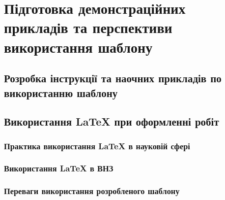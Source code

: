 \chapter{Підготовка демонстраційних прикладів та перспективи використання шаблону} 
\label{chap:first}



\section{Розробка інструкції та наочних прикладів по використанню шаблону}


\section{Використання \LaTeX{} при оформленні робіт}



\subsection{Практика використання \LaTeX{} в науковій сфері}

\subsection{Використання \LaTeX{} в ВНЗ}

\subsection{Переваги використання розробленого шаблону}
